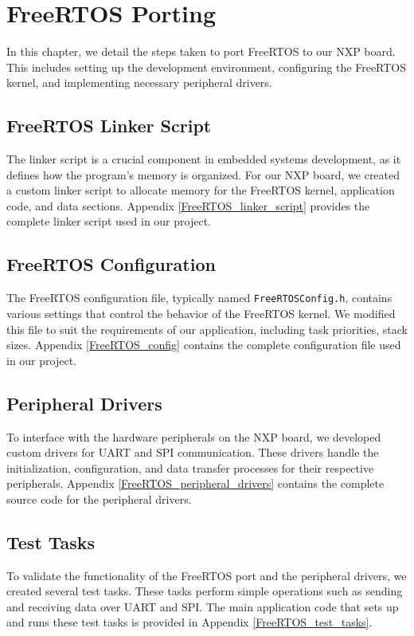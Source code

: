 \section{FreeRTOS Porting}

In this chapter, we detail the steps taken to port FreeRTOS to our NXP board. This includes setting up the development environment, configuring the FreeRTOS kernel, and implementing necessary peripheral drivers.

\subsection{FreeRTOS Linker Script}

The linker script is a crucial component in embedded systems development, as it defines how the program's memory is organized. For our NXP board, we created a custom linker script to allocate memory for the FreeRTOS kernel, application code, and data sections. Appendix \ref{FreeRTOS_linker_script} provides the complete linker script used in our project.

\subsection{FreeRTOS Configuration}
The FreeRTOS configuration file, typically named \texttt{FreeRTOSConfig.h}, contains various settings that control the behavior of the FreeRTOS kernel. We modified this file to suit the requirements of our application, including task priorities, stack sizes. Appendix \ref{FreeRTOS_config} contains the complete configuration file used in our project.

\subsection{Peripheral Drivers}

To interface with the hardware peripherals on the NXP board, we developed custom drivers for UART and SPI communication. These drivers handle the initialization, configuration, and data transfer processes for their respective peripherals. Appendix \ref{FreeRTOS_peripheral_drivers} contains the complete source code for the peripheral drivers.

\subsection{Test Tasks}

To validate the functionality of the FreeRTOS port and the peripheral drivers, we created several test tasks. These tasks perform simple operations such as sending and receiving data over UART and SPI. The main application code that sets up and runs these test tasks is provided in Appendix \ref{FreeRTOS_test_tasks}.